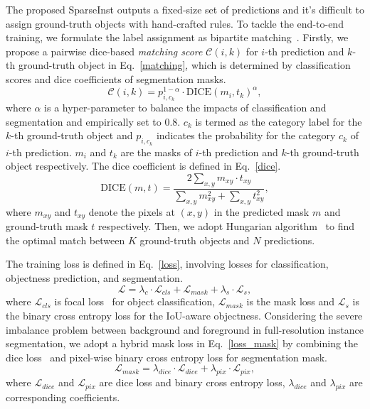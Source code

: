 \documentclass[10pt,twocolumn,letterpaper]{article}
\newcommand{\name}{SparseInst}
\begin{document}
The proposed \name{} outputs a fixed-size set of predictions and it's difficult to assign ground-truth objects with hand-crafted rules.
To tackle the end-to-end training, we formulate the label assignment as bipartite matching~\cite{DETRCarionMSUKZ20}.
Firstly, we propose a pairwise dice-based \textit{matching score} $\mathcal{C}(i, k)$ for $i$-th prediction and $k$-th ground-truth object in Eq.~\eqref{matching}, which is determined by classification scores and dice coefficients of segmentation masks.
\begin{equation}
    \label{matching}
    \mathcal{C}(i, k) = p_{i,c_k}^{1-\alpha}\cdot\text{DICE}(m_i,t_k)^{\alpha},
\end{equation}
where $\alpha$ is a hyper-parameter to balance the impacts of classification and segmentation and empirically set to 0.8. $c_k$ is termed as the category label for the $k$-th ground-truth object and $p_{i,c_k}$ indicates the probability for the category $c_k$ of $i$-th prediction. $m_i$ and $t_k$ are the masks of $i$-th prediction and $k$-th ground-truth object respectively.
The dice coefficient is defined in Eq.~\eqref{dice}.
\begin{equation}
    \label{dice}
    \text{DICE}(m,t) = \frac{2\sum_{x,y} m_{xy} \cdot t_{xy}}{\sum_{x,y}m^2_{xy}+\sum_{x,y}t^2_{xy}},
\end{equation}
where $m_{xy}$ and $t_{xy}$ denote the pixels at $(x,y)$ in the predicted mask $m$ and ground-truth mask $t$ respectively.
Then, we adopt Hungarian algorithm~\cite{HungarianStewartAN16} to find the optimal match between $K$ ground-truth objects and $N$ predictions. 


The training loss is defined in Eq.~\eqref{loss}, involving losses for classification, objectness prediction, and segmentation.
\begin{equation}
    \label{loss}
    \mathcal{L} = \lambda_c\cdot\mathcal{L}_{cls} + \mathcal{L}_{mask} + \lambda_{s}\cdot\mathcal{L}_{s},
\end{equation}
where $\mathcal{L}_{cls}$ is focal loss~\cite{FocalLinGGHD17} for object classification, $\mathcal{L}_{mask}$ is the mask loss and $\mathcal{L}_{s}$ is the binary cross entropy loss for the IoU-aware objectness.
Considering the severe imbalance problem between background and foreground in full-resolution instance segmentation, we adopt a hybrid mask loss in Eq.~\eqref{loss_mask} by combining the dice loss~\cite{MilletariNA16} and pixel-wise binary cross entropy loss for segmentation mask.
\begin{equation}
    \label{loss_mask}
    \mathcal{L}_{mask} = \lambda_{dice}\cdot\mathcal{L}_{dice} +\lambda_{pix}\cdot\mathcal{L}_{pix},
\end{equation}
where $\mathcal{L}_{dice}$ and $\mathcal{L}_{pix}$ are dice loss and binary cross entropy loss,  $\lambda_{dice}$ and $\lambda_{pix}$ are corresponding coefficients.
\end{document}
